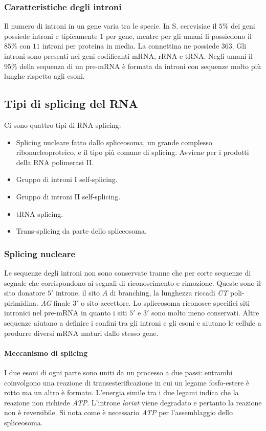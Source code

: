 \subsubsection{Caratteristiche degli introni}
Il numero di introni in un gene varia tra le specie. In S. cerevisiae il $5\%$ dei geni possiede introni e tipicamente $1$ per gene, mentre per gli umani li possiedono il $85\%$ con 
$11$ introni per proteina in media. La connettina ne possiede $363$. Gli introni sono presenti nei geni codificanti mRNA, rRNA e tRNA. Negli umani il $95\%$ della sequenza di un pre-mRNA
\`e formata da introni con sequenze molto pi\`u lunghe rispetto agli esoni. 
\subsection{Tipi di splicing del RNA}
Ci sono quattro tipi di RNA splicing:
\begin{itemize}
	\item Splicing nucleare fatto dallo spliceosoma, un grande complesso ribonucleoproteico, e il tipo pi\`u comune di splicing. Avviene per i prodotti della RNA polimerasi II.
	\item Gruppo di introni I self-splicing.
	\item Gruppo di introni II self-splicing.
	\item tRNA splicing.
	\item Trans-splicing da parte dello spliceosoma.
\end{itemize}
\subsubsection{Splicing nucleare}
Le sequenze degli introni non sono conservate tranne che per corte sequenze di segnale che corrispondono ai segnali di riconoscimento e rimozione. Queste sono il sito donatore
$5'$ introne, il sito $A$ di branching, la lunghezza riccadi \emph{CT} poli-pirimidina. \emph{AG} finale $3'$ o sito accettore. Lo spliceosoma riconosce specifici siti intronici nel 
pre-mRNA in quanto i siti $5'$ e $3'$ sono molto meno conservati. Altre sequenze aiutano a definire i confini tra gli introni e gli esoni e aiutano le cellule a produrre diversi mRNA 
maturi dallo stesso gene. 
\paragraph{Meccanismo di splicing}
I due esoni di ogni parte sono uniti da un processo a due passi: entrambi coinvolgono una reazione di transesterificazione in cui un legame fosfo-estere \`e rotto ma un altro 
\`e formato. L'energia simile tra i due legami indica che la reazione non richiede \emph{ATP}. L'introne \emph{lariat} viene degradato e pertanto la reazione non \`e reversibile. Si nota
come \`e necessario \emph{ATP} per l'assemblaggio dello spliceosoma. 

